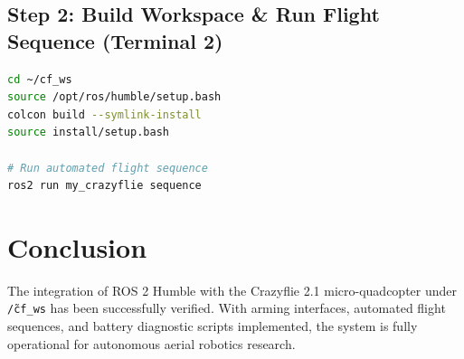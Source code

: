 \documentclass[11pt,a4paper]{article}
\begin{document}
\subsection{Step 2: Build Workspace \& Run Flight Sequence (Terminal 2)}
\begin{lstlisting}[language=bash]
cd ~/cf_ws
source /opt/ros/humble/setup.bash
colcon build --symlink-install
source install/setup.bash

# Run automated flight sequence
ros2 run my_crazyflie sequence
\end{lstlisting}

\section{Conclusion}
The integration of ROS 2 Humble with the Crazyflie 2.1 micro-quadcopter under \texttt{\~/cf\_ws} has been successfully verified. With arming interfaces, automated flight sequences, and battery diagnostic scripts implemented, the system is fully operational for autonomous aerial robotics research.
\end{document}

